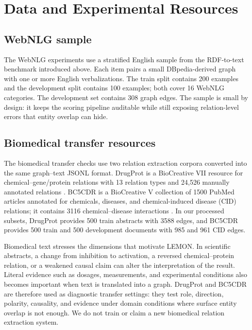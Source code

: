 \section{Data and Experimental Resources}
\subsection{WebNLG sample}
The WebNLG experiments use a stratified English sample from the RDF-to-text benchmark introduced above. Each item pairs a small DBpedia-derived graph with one or more English verbalizations. The train split contains 200 examples and the development split contains 100 examples; both cover 16 WebNLG categories. The development set contains 308 graph edges. The sample is small by design: it keeps the scoring pipeline auditable while still exposing relation-level errors that entity overlap can hide.

\subsection{Biomedical transfer resources}
The biomedical transfer checks use two relation extraction corpora converted into the same graph--text JSONL format. DrugProt is a BioCreative VII resource for chemical--gene/protein relations with 13 relation types and 24,526 manually annotated relations \cite{miranda2023drugprot}. BC5CDR is a BioCreative V collection of 1500 PubMed articles annotated for chemicals, diseases, and chemical-induced disease (CID) relations; it contains 3116 chemical--disease interactions \cite{li2016bc5cdr}. In our processed subsets, DrugProt provides 500 train abstracts with 3588 edges, and BC5CDR provides 500 train and 500 development documents with 985 and 961 CID edges.

Biomedical text stresses the dimensions that motivate LEMON. In scientific abstracts, a change from inhibition to activation, a reversed chemical--protein relation, or a weakened causal claim can alter the interpretation of the result. Literal evidence such as dosages, measurements, and experimental conditions also becomes important when text is translated into a graph. DrugProt and BC5CDR are therefore used as diagnostic transfer settings: they test role, direction, polarity, causality, and evidence under domain conditions where surface entity overlap is not enough. We do not train or claim a new biomedical relation extraction system.


